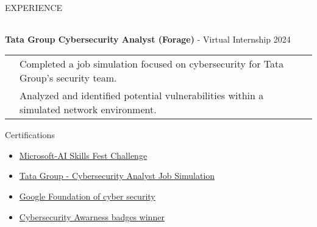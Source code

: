 \documentclass{resume}
\begin{document}
\begin{rSection}{EXPERIENCE}
\begin{itemize}
\begin{tabular}{>{\bfseries}l l}
        \end{tabular}
    \end{itemize}
    \begin{itemize}
        {\bf Tata Group Cybersecurity Analyst (Forage)} - Virtual Internship \hfill {2024}\\
        \begin{tabular}{>{\bfseries}l l}
            \textbf{} & Completed a job simulation focused on cybersecurity for Tata Group's security team. \\
            & Analyzed and identified potential vulnerabilities within a simulated network environment. \\
        \end{tabular}
    \end{itemize}
    
\end{rSection}

\vspace{-0.2em}
\begin{rSection}{Certifications}
    \begin{itemize}
        \item \href{https://learn.microsoft.com/en-gb/users/trishamandal-9657/achievements}{ Microsoft-AI Skills Fest Challenge}
        \item \href{https://forage-uploads-prod.s3.amazonaws.com/completion-certificates/ifobHAoMjQs9s6bKS/gmf3ypEXBj2wvfQWC_ifobHAoMjQs9s6bKS_6Nb4sGDuznzcHyCSu_1732378719946_completion_certificate.pdf}{Tata Group - Cybersecurity Analyst Job Simulation}
        \item \href{https://coursera.org/share/dc5df20e6dc55a6b8b97cd5bc2d5d927}{Google Foundation of cyber security}
        \item \href{https://app.kajabi.com/certificates/1d00b4fe}{Cybersecurity Awarness badges winner}
    \end{itemize}
    \vspace{-0.4em}
\end{rSection}
\end{document}
